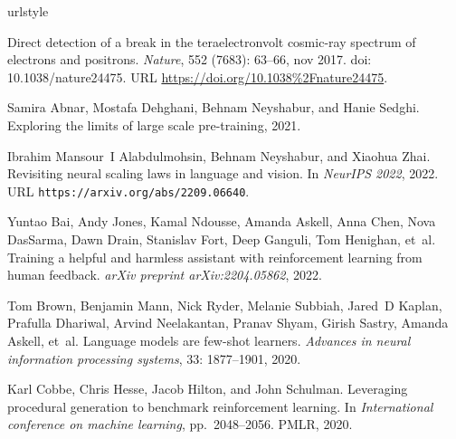 \documentclass{article} %
\begin{document}
\begin{thebibliography}{44}
\providecommand{\natexlab}[1]{#1}
\providecommand{\url}[1]{\texttt{#1}}
\expandafter\ifx\csname urlstyle\endcsname\relax
  \providecommand{\doi}[1]{doi: #1}\else
  \providecommand{\doi}{doi: \begingroup \urlstyle{rm}\Url}\fi

Direct detection of a break in the teraelectronvolt cosmic-ray spectrum of
  electrons and positrons.
\newblock \emph{Nature}, 552 (7683): 63--66, nov 2017.
\newblock \doi{10.1038/nature24475}.
\newblock URL \url{https://doi.org/10.1038%2Fnature24475}.

Samira Abnar, Mostafa Dehghani, Behnam Neyshabur, and Hanie Sedghi.
\newblock Exploring the limits of large scale pre-training, 2021.

Ibrahim Mansour~I Alabdulmohsin, Behnam Neyshabur, and Xiaohua Zhai.
\newblock Revisiting neural scaling laws in language and vision.
\newblock In \emph{NeurIPS 2022}, 2022.
\newblock URL \url{https://arxiv.org/abs/2209.06640}.

Yuntao Bai, Andy Jones, Kamal Ndousse, Amanda Askell, Anna Chen, Nova DasSarma,
  Dawn Drain, Stanislav Fort, Deep Ganguli, Tom Henighan, et~al.
\newblock Training a helpful and harmless assistant with reinforcement learning
  from human feedback.
\newblock \emph{arXiv preprint arXiv:2204.05862}, 2022.

Tom Brown, Benjamin Mann, Nick Ryder, Melanie Subbiah, Jared~D Kaplan, Prafulla
  Dhariwal, Arvind Neelakantan, Pranav Shyam, Girish Sastry, Amanda Askell,
  et~al.
\newblock Language models are few-shot learners.
\newblock \emph{Advances in neural information processing systems},
  33: 1877--1901, 2020.

Karl Cobbe, Chris Hesse, Jacob Hilton, and John Schulman.
\newblock Leveraging procedural generation to benchmark reinforcement learning.
\newblock In \emph{International conference on machine learning}, pp.\
  2048--2056. PMLR, 2020.


\end{thebibliography}
\end{document}
